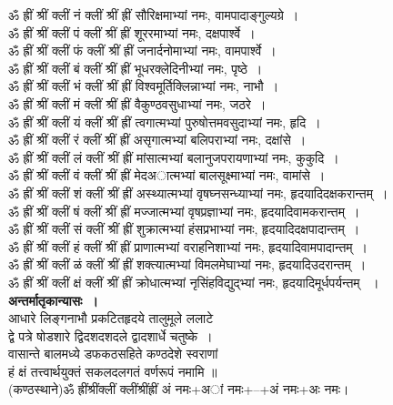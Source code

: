 \documentclass[twoside,top=1.7cm, bottom=1.7cm, outer=1cm,landscape, inner=1.5cm,a5paper,]{book}
\begin{document}
ॐ ह्रीं श्रीं क्लीं नं क्लीं श्रीं ह्रीं सौरिक्षमाभ्यां नमः, वामपादाङ्गुल्यग्रे~।\\
ॐ ह्रीं श्रीं क्लीं पं क्लीं श्रीं ह्रीं शूररमाभ्यां नमः, दक्षपार्श्वे~।\\
ॐ ह्रीं श्रीं क्लीं फं क्लीं श्रीं ह्रीं जनार्दनोमाभ्यां नमः, वामपार्श्वे~।\\
ॐ ह्रीं श्रीं क्लीं बं क्लीं श्रीं ह्रीं भूधरक्लेदिनीभ्यां नमः, पृष्ठे~।\\
ॐ ह्रीं श्रीं क्लीं भं क्लीं श्रीं ह्रीं विश्वमूर्तिक्लिन्नाभ्यां नमः, नाभौ~।\\
ॐ ह्रीं श्रीं क्लीं मं क्लीं श्रीं ह्रीं वैकुण्ठवसुधाभ्यां नमः, जठरे~।\\
ॐ ह्रीं श्रीं क्लीं यं क्लीं श्रीं ह्रीं त्वगात्मभ्यां पुरुषोत्तमवसुदाभ्यां नमः, हृदि~।\\
ॐ ह्रीं श्रीं क्लीं रं क्लीं श्रीं ह्रीं असृगात्मभ्यां बलिपराभ्यां नमः, दक्षांसे~।\\
ॐ ह्रीं श्रीं क्लीं लं क्लीं श्रीं ह्रीं मांसात्मभ्यां बलानुजपरायणाभ्यां नमः, कुकुदि~।\\
ॐ ह्रीं श्रीं क्लीं वं क्लीं श्रीं ह्रीं मेदअात्मभ्यां बालसूक्ष्माभ्यां नमः, वामांसे~।\\
ॐ ह्रीं श्रीं क्लीं शं क्लीं श्रीं ह्रीं अस्थ्यात्मभ्यां वृषघ्नसन्ध्याभ्यां नमः, हृदयादिदक्षकरान्तम्~।\\
ॐ ह्रीं श्रीं क्लीं षं क्लीं श्रीं ह्रीं मज्जात्मभ्यां वृषप्रज्ञाभ्यां नमः, हृदयादिवामकरान्तम्~।\\
ॐ ह्रीं श्रीं क्लीं सं क्लीं श्रीं ह्रीं शुक्रात्मभ्यां हंसप्रभाभ्यां नमः, हृदयादिदक्षपादान्तम्~।\\
ॐ ह्रीं श्रीं क्लीं हं क्लीं श्रीं ह्रीं प्राणात्मभ्यां वराहनिशाभ्यां नमः, हृदयादिवामपादान्तम्~।\\
ॐ ह्रीं श्रीं क्लीं ळं क्लीं श्रीं ह्रीं शक्त्यात्मभ्यां विमलमेघाभ्यां नमः, हृदयादिउदरान्तम्~।\\
ॐ ह्रीं श्रीं क्लीं क्षं क्लीं श्रीं ह्रीं क्रोधात्मभ्यां नृसिंहविद्युद्भ्यां नमः, हृदयादिमूर्धपर्यन्तम् ~।\\[10pt]
{\bfseries अन्तर्मातृकान्यासः~।}\\
आधारे लिङ्गनाभौ प्रकटितहृदये तालुमूले ललाटे\\
     द्वे पत्रे षोडशारे द्विदशदशदले द्वादशार्धे चतुष्के~।\\
वासान्ते बालमध्ये डफकठसहिते कण्ठदेशे स्वराणां\\
     हं क्षं तत्त्वार्थयुक्तं सकलदलगतं वर्णरूपं नमामि ॥\\
(कण्ठस्थाने)ॐ ह्रींश्रींक्लीं क्लींश्रींह्रीं अं नमः+अां नमः+--+अं नमः+अः नमः।\\
\end{document}
